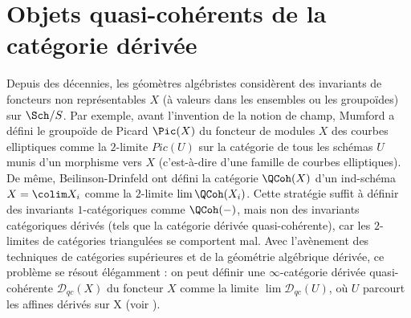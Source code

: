 \section{Objets quasi-cohérents de la catégorie dérivée}
\label{section-QC}

\noindent
Depuis des décennies, les géomètres algébristes considèrent des invariants de
foncteurs non représentables $X$ (à valeurs dans les ensembles ou les groupoïdes) sur $\Sch/S$.
Par exemple,
avant l'invention de la notion de champ, Mumford a défini \cite{mumford_picard}
le groupoïde de Picard $\Pic(X)$ du foncteur de modules $X$ des courbes elliptiques
comme la $2$-limite $Pic(U)$ sur la catégorie de tous les schémas $U$
munis d'un morphisme vers $X$ (c'est-à-dire d'une famille de courbes elliptiques).
De même, Beilinson-Drinfeld ont défini \cite{BVGD} la catégorie
$\QCoh(X)$ d'un ind-schéma $X = \colim X_i$ comme la $2$-limite
$\lim \QCoh(X_i)$.
Cette stratégie suffit à définir des invariants $1$-catégoriques
comme $\QCoh(-)$, mais non des invariants catégoriques dérivés
(tels que la catégorie dérivée quasi-cohérente), car les $2$-limites
de catégories triangulées se comportent mal.
Avec l'avènement des techniques de catégories supérieures
et de la géométrie algébrique dérivée, ce problème se
résout élégamment : on peut définir une
$\infty$-catégorie dérivée quasi-cohérente $\mathcal{D}_{qc}(X)$ du foncteur $X$
comme la limite $\lim \mathcal{D}_{qc}(U)$, où $U$
parcourt les affines dérivés sur X (voir \cite{lurie-thesis}).

